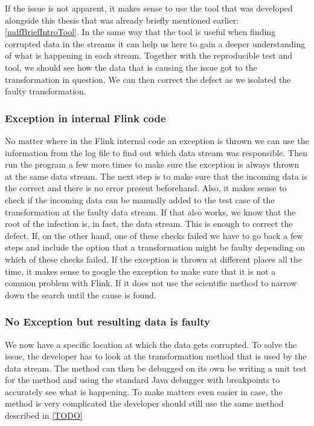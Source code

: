 If the issue is not apparent, it makes sense to use the tool that was developed alongside this thesis that was already briefly mentioned earlier: \ref{mdfBriefIntroTool}. In the same way that the tool is useful when finding corrupted data in the streams it can help us here to gain a deeper understanding of what is happening in each stream. Together with the reproducible test and tool, we should see how the data that is causing the issue got to the transformation in question. We can then correct the defect as we isolated the faulty transformation.

\subsubsection{Exception in internal Flink code}
No matter where in the Flink internal code an exception is thrown we can use the information from the log file to find out which data stream was responsible. Then run the program a few more times to make sure the exception is always thrown at the same data stream. The next step is to make sure that the incoming data is the correct and there is no error present beforehand. Also, it makes sense to check if the incoming data can be manually added to the test case of the transformation at the faulty data stream. If that also works, we know that the root of the infection is, in fact, the data stream. This is enough to correct the defect. If, on the other hand, one of these checks failed we have to go back a few steps and include the option that a transformation might be faulty depending on which of these checks failed. If the exception is thrown at different places all the time, it makes sense to google the exception to make sure that it is not a common problem with Flink. If it does not use the scientific method to narrow down the search until the cause is found.

\subsubsection{No Exception but resulting data is faulty}
We now have a specific location at which the data gets corrupted. To solve the issue, the developer has to look at the transformation method that is used by the data stream. The method can then be debugged on its own be writing a unit test for the method and using the standard Java debugger with breakpoints to accurately see what is happening. To make matters even easier in case, the method is very complicated the developer should still use the same method described in \ref{TODO}

